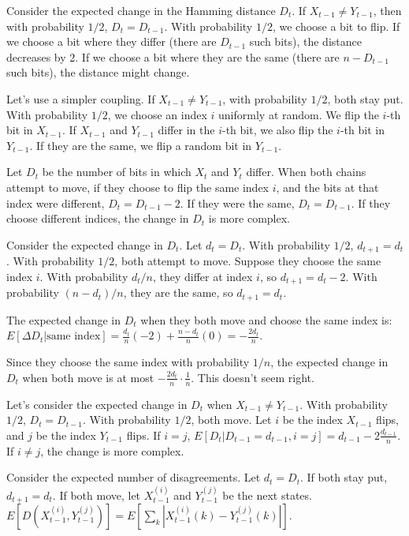 \begin{enumerate}
\begin{shaded}
Consider the expected change in the Hamming distance $D_t$. If $X_{t-1} \neq Y_{t-1}$, then with probability $1/2$, $D_t = D_{t-1}$. With probability $1/2$, we choose a bit to flip. If we choose a bit where they differ (there are $D_{t-1}$ such bits), the distance decreases by 2. If we choose a bit where they are the same (there are $n - D_{t-1}$ such bits), the distance might change.

Let's use a simpler coupling. If $X_{t-1} \neq Y_{t-1}$, with probability $1/2$, both stay put. With probability $1/2$, we choose an index $i$ uniformly at random. We flip the $i$-th bit in $X_{t-1}$. If $X_{t-1}$ and $Y_{t-1}$ differ in the $i$-th bit, we also flip the $i$-th bit in $Y_{t-1}$. If they are the same, we flip a random bit in $Y_{t-1}$.

Let $D_t$ be the number of bits in which $X_t$ and $Y_t$ differ. When both chains attempt to move, if they choose to flip the same index $i$, and the bits at that index were different, $D_t = D_{t-1} - 2$. If they were the same, $D_t = D_{t-1}$. If they choose different indices, the change in $D_t$ is more complex.

Consider the expected change in $D_t$. Let $d_t = D_t$. With probability $1/2$, $d_{t+1} = d_t$. With probability $1/2$, both attempt to move. Suppose they choose the same index $i$. With probability $d_t / n$, they differ at index $i$, so $d_{t+1} = d_t - 2$. With probability $(n - d_t) / n$, they are the same, so $d_{t+1} = d_t$.

The expected change in $D_t$ when they both move and choose the same index is:
$E[\Delta D_t | \text{same index}] = \frac{d_t}{n} (-2) + \frac{n - d_t}{n} (0) = -\frac{2d_t}{n}$.

Since they choose the same index with probability $1/n$, the expected change in $D_t$ when both move is at most $-\frac{2d_t}{n} \cdot \frac{1}{n}$. This doesn't seem right.

Let's consider the expected change in $D_t$ when $X_{t-1} \neq Y_{t-1}$. With probability $1/2$, $D_t = D_{t-1}$. With probability $1/2$, both move. Let $i$ be the index $X_{t-1}$ flips, and $j$ be the index $Y_{t-1}$ flips. If $i=j$, $E[D_t | D_{t-1} = d_{t-1}, i=j] = d_{t-1} - 2 \frac{d_{t-1}}{n}$. If $i \neq j$, the change is more complex.

Consider the expected number of disagreements. Let $d_t = D_t$. If both stay put, $d_{t+1} = d_t$. If both move, let $X_{t-1}^{(i)}$ and $Y_{t-1}^{(j)}$ be the next states.
$E[D(X_{t-1}^{(i)}, Y_{t-1}^{(j)})] = E[\sum_k |X_{t-1}^{(i)}(k) - Y_{t-1}^{(j)}(k)|]$.


\end{shaded}
\end{enumerate}

